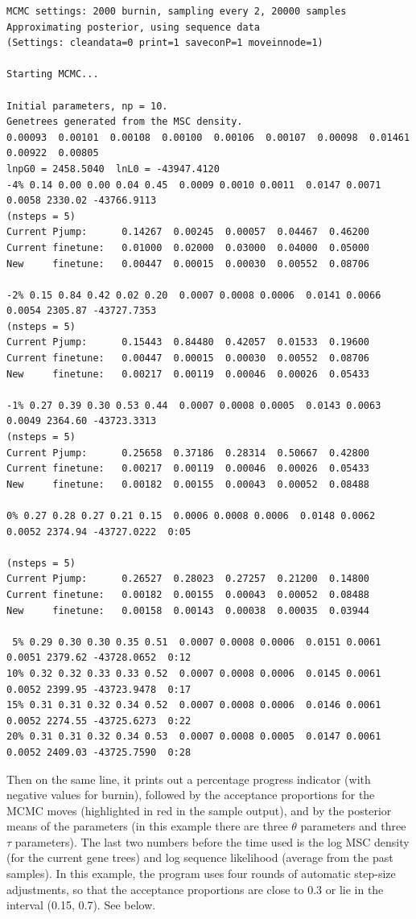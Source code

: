 \documentclass[a4paper]{book}
\numberwithin{equation}{section} \renewcommand{\baselinestretch}{0.55}
\begin{document}
\begin{verbatim}
MCMC settings: 2000 burnin, sampling every 2, 20000 samples
Approximating posterior, using sequence data
(Settings: cleandata=0 print=1 saveconP=1 moveinnode=1)

Starting MCMC...

Initial parameters, np = 10.
Genetrees generated from the MSC density.
0.00093  0.00101  0.00108  0.00100  0.00106  0.00107  0.00098  0.01461  0.00922  0.00805
lnpG0 = 2458.5040  lnL0 = -43947.4120
-4% 0.14 0.00 0.00 0.04 0.45  0.0009 0.0010 0.0011  0.0147 0.0071 0.0058 2330.02 -43766.9113
(nsteps = 5)
Current Pjump:      0.14267  0.00245  0.00057  0.04467  0.46200
Current finetune:   0.01000  0.02000  0.03000  0.04000  0.05000
New     finetune:   0.00447  0.00015  0.00030  0.00552  0.08706

-2% 0.15 0.84 0.42 0.02 0.20  0.0007 0.0008 0.0006  0.0141 0.0066 0.0054 2305.87 -43727.7353
(nsteps = 5)
Current Pjump:      0.15443  0.84480  0.42057  0.01533  0.19600
Current finetune:   0.00447  0.00015  0.00030  0.00552  0.08706
New     finetune:   0.00217  0.00119  0.00046  0.00026  0.05433

-1% 0.27 0.39 0.30 0.53 0.44  0.0007 0.0008 0.0005  0.0143 0.0063 0.0049 2364.60 -43723.3313
(nsteps = 5)
Current Pjump:      0.25658  0.37186  0.28314  0.50667  0.42800
Current finetune:   0.00217  0.00119  0.00046  0.00026  0.05433
New     finetune:   0.00182  0.00155  0.00043  0.00052  0.08488

0% 0.27 0.28 0.27 0.21 0.15  0.0006 0.0008 0.0006  0.0148 0.0062 0.0052 2374.94 -43727.0222  0:05

(nsteps = 5)
Current Pjump:      0.26527  0.28023  0.27257  0.21200  0.14800
Current finetune:   0.00182  0.00155  0.00043  0.00052  0.08488
New     finetune:   0.00158  0.00143  0.00038  0.00035  0.03944

 5% 0.29 0.30 0.30 0.35 0.51  0.0007 0.0008 0.0006  0.0151 0.0061 0.0051 2379.62 -43728.0652  0:12
10% 0.32 0.32 0.33 0.33 0.52  0.0007 0.0008 0.0006  0.0145 0.0061 0.0052 2399.95 -43723.9478  0:17
15% 0.31 0.31 0.32 0.34 0.52  0.0007 0.0008 0.0006  0.0146 0.0061 0.0052 2274.55 -43725.6273  0:22
20% 0.31 0.31 0.32 0.34 0.53  0.0007 0.0008 0.0005  0.0147 0.0061 0.0052 2409.03 -43725.7590  0:28
\end{verbatim}

Then on the same line, it prints out a percentage progress indicator
(with negative values for burnin), followed by the acceptance
proportions for the MCMC moves (highlighted in red in the sample
output), and by the posterior means of the parameters (in this example
there are three $\theta$ parameters and three $\tau$ parameters).  The
last two numbers before the time used is the log MSC density (for the
current gene trees) and log sequence likelihood (average from the past
samples).  In this example, the program uses four rounds of automatic
step-size adjustments, so that the acceptance proportions are close to
0.3 or lie in the interval (0.15, 0.7).  See below.
\end{document}
